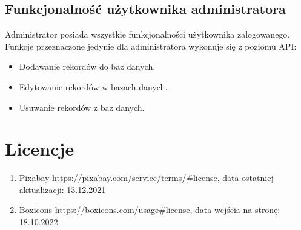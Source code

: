\documentclass[12pt]{article}
\begin{document}
\begin{flushleft}
		\subsection{Funkcjonalność użytkownika administratora}	
		Administrator posiada wszystkie funkcjonalności użytkownika zalogowanego. Funkcje przeznaczone jedynie dla administratora wykonuje się z poziomu API:
		\begin{itemize}
			\item Dodawanie rekordów do baz danych.
			\item Edytowanie rekordów w bazach danych. 
			\item Usuwanie rekordów z baz danych.
		\end{itemize}
	
	
	


	
	
			
	\pagebreak
	\section{Licencje}
		\begin{enumerate}
			\item	Pixabay
			\url{https://pixabay.com/service/terms/#license}, 
			data ostatniej aktualizacji: 13.12.2021
			
			
			\item	Boxicons
			\url{https://boxicons.com/usage#license}, 
			data wejścia na stronę: 18.10.2022
		\end{enumerate}
	
	
	
%	
%	
	
\end{flushleft}
\end{document}
